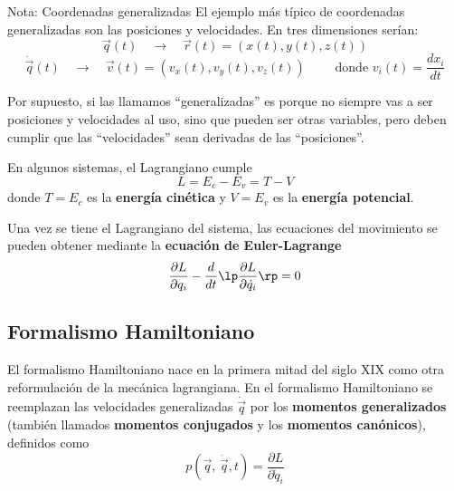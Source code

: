     \begin{mybox_blue}{Nota: Coordenadas generalizadas}
        El ejemplo más típico de coordenadas generalizadas son las posiciones y velocidades. En tres dimensiones serían:
        \begin{equation}
        \vec{q}(t)  \quad \rightarrow \quad \vec{r}(t) = (x(t), y(t), z(t))
        \end{equation}
        \begin{equation}
            \dot{\vec{q}}(t) \quad \rightarrow \quad \vec{v}(t) = (v_x(t), v_y(t), v_z(t))  \qquad \text{ donde } v_i(t) = \frac{d x_i}{dt}
        \end{equation}

        \vspace{0.3cm}
        Por supuesto, si las llamamos ``generalizadas'' es porque no siempre vas a ser posiciones y velocidades al uso, sino que pueden ser otras variables, pero deben cumplir que las ``velocidades'' sean derivadas de las ``posiciones''.
    \end{mybox_blue}
    
    En algunos sistemas, el Lagrangiano cumple
    \begin{equation} \label{ec_sqc_FLagrangiano_L_T_V}
        L = E_c - E_v = T - V
    \end{equation}
    donde $T=E_c$  es la \textbf{energía cinética} y $V=E_v$ es la \textbf{energía potencial}.

    Una vez se tiene el Lagrangiano del sistema, las ecuaciones del movimiento se pueden obtener mediante la \textbf{ecuación de Euler-Lagrange}
    \begin{equation} \label{ec_sqc_ec_euler_lagrange}
        \frac{\partial L }{\partial q_i} -\frac{d}{dt} \lp \frac{\partial L }{\partial \dot{q}_i} \rp = 0
    \end{equation}





    \subsection{Formalismo Hamiltoniano}

    El formalismo Hamiltoniano nace en la primera mitad del siglo XIX como otra reformulación de la mecánica lagrangiana.  En el formalismo Hamiltoniano se reemplazan las velocidades generalizadas $\dot{\vec{q}}$ por los \textbf{momentos generalizados} (también llamados \textbf{momentos conjugados} y los \textbf{momentos canónicos}), definidos como
    \begin{equation} \label{ec_sqc_FHamiltoniano_p}
        p (\vec{q},\,  \dot{\vec{q}}, t) = \frac{\partial L}{\partial \dot{q}_i}
    \end{equation}

